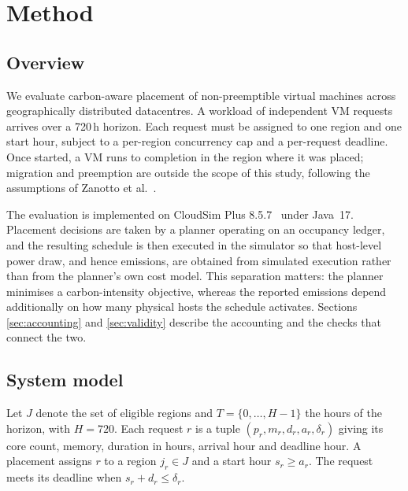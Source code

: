 
\section{Method}
\label{sec:method}

\subsection{Overview}

We evaluate carbon-aware placement of non-preemptible virtual machines across
geographically distributed datacentres. A workload of independent VM requests
arrives over a 720\,h horizon. Each request must be assigned to one region and
one start hour, subject to a per-region concurrency cap and a per-request
deadline. Once started, a VM runs to completion in the region where it was
placed; migration and preemption are outside the scope of this study, following
the assumptions of Zanotto et al.~\cite{zanotto2025usercentric}.

The evaluation is implemented on CloudSim Plus 8.5.7~\cite{silvafilho2017cloudsimplus}
under Java~17. Placement
decisions are taken by a planner operating on an occupancy ledger, and the
resulting schedule is then executed in the simulator so that host-level power
draw, and hence emissions, are obtained from simulated execution rather than
from the planner's own cost model. This separation matters: the planner
minimises a carbon-intensity objective, whereas the reported emissions depend
additionally on how many physical hosts the schedule activates. Sections
\ref{sec:accounting} and \ref{sec:validity} describe the accounting and the
checks that connect the two.

\subsection{System model}

Let $J$ denote the set of eligible regions and $T = \{0,\dots,H-1\}$ the hours
of the horizon, with $H = 720$. Each request $r$ is a tuple
$(p_r, m_r, d_r, a_r, \delta_r)$ giving its core count, memory, duration in
hours, arrival hour and deadline hour. A placement assigns $r$ to a region
$j_r \in J$ and a start hour $s_r \ge a_r$. The request meets its deadline when
$s_r + d_r \le \delta_r$.

